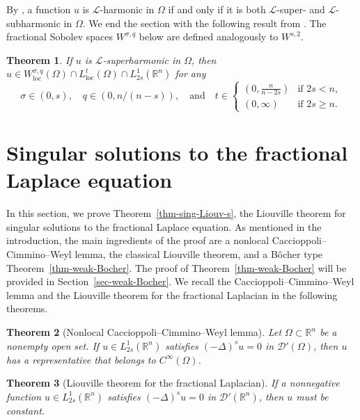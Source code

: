\documentclass[11pt]{amsart}
\theoremstyle{plain}
\newtheorem{theorem}{Theorem}[section]
\theoremstyle{definition}
\numberwithin{equation}{section}
\begin{document}
By \cite[Corollary~7]{KKP17}, a function $u$ is $\mathcal{L}$-harmonic in $\Omega$ if and only if it is both $\mathcal{L}$-super- and $\mathcal{L}$-subharmonic in $\Omega$. We end the section with the following result from \cite{KKP17}. The fractional Sobolev spaces $W^{\sigma, q}$ below are defined analogously to $W^{s, 2}$.

\begin{theorem}\cite[Theorem~1(ii)]{KKP17}\label{thm-integrability}
If $u$ is $\mathcal{L}$-superharmonic in $\Omega$, then $u \in W^{\sigma, q}_{\mathrm{loc}}(\Omega) \cap L^t_{\mathrm{loc}}(\Omega) \cap L^{1}_{2s}(\mathbb{R}^n)$ for any
\begin{equation*}
   \sigma \in (0, s), \quad q \in (0, n/(n-s)), \quad\text{and}\quad t \in
   \begin{cases}
       (0, \frac{n}{n-2s}) &\text{if }2s<n, \\
       (0, \infty) &\text{if }2s\geq n.
   \end{cases}
\end{equation*}
\end{theorem}

\section{Singular solutions to the fractional Laplace equation}\label{sec-fL}

In this section, we prove Theorem~\ref{thm-sing-Liouv-s}, the Liouville theorem for singular solutions to the fractional Laplace equation. As mentioned in the introduction, the main ingredients of the proof are a nonlocal Caccioppoli--Cimmino--Weyl lemma, the classical Liouville theorem, and a B\^ocher type Theorem~\ref{thm-weak-Bocher}. The proof of Theorem~\ref{thm-weak-Bocher} will be provided in Section~\ref{sec-weak-Bocher}. We recall the Caccioppoli--Cimmino--Weyl lemma and the Liouville theorem for the fractional Laplacian in the following theorems.

\begin{theorem}[Nonlocal Caccioppoli--Cimmino--Weyl lemma]\cite[Theorem~12.17]{Gar19}\label{thm-Weyl}
Let $\Omega \subset \mathbb{R}^n$ be a nonempty open set. If $u \in L^1_{2s}(\mathbb{R}^n)$ satisfies $(-\Delta)^su=0$ in $\mathscr{D}'(\Omega)$, then $u$ has a representative that belongs to $C^\infty(\Omega)$.
\end{theorem}

\begin{theorem}[Liouville theorem for the fractional Laplacian]\cite[Lemma~3.2]{BKN02}\label{thm-Liouville-s}
If a nonnegative function $u \in L^1_{2s}(\mathbb{R}^n)$ satisfies $(-\Delta)^su=0$ in $\mathscr{D}'(\mathbb{R}^n)$, then $u$ must be constant.
\end{theorem}
\end{document}
